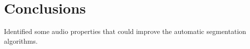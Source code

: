 \documentclass{article}
\begin{document}
\section{Conclusions}

Identified some audio properties that could improve the automatic segmentation algorithms.








\end{document}
